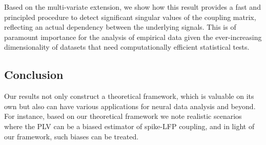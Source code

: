Based on the multi-variate extension,
we show how this result provides a fast and principled procedure to detect significant singular values of the coupling matrix, reflecting an actual dependency between the underlying signals.
This is of paramount importance for the analysis of empirical data given the ever-increasing dimensionality of datasets that need computationally efficient statistical tests.

\subsection*{Conclusion}
Our results not only construct a theoretical framework, which is valuable on its own
but also can have various applications for neural data analysis and beyond.
For instance, based on our theoretical framework we note realistic scenarios where the PLV can be a biased estimator of spike-LFP coupling, and in light of our framework, such biases can be treated. 




